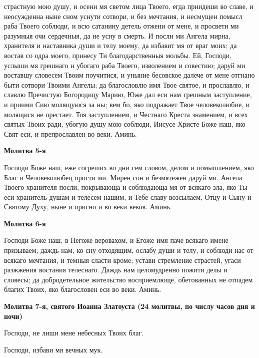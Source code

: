 страстную мою душу, и осени мя светом лица Твоего, егда приидеши во
славе, и неосужденна ныне сном уснути сотвори, и без мечтания, и
несмущен помысл раба Твоего соблюди, и всю сатанину детель отжени от
мене, и просвети ми разумныя очи сердечныя, да не усну в смерть. И
посли ми Ангела мирна, хранителя и наставника души и телу моему,
да избавит мя от враг моих; да востав со одра моего, принесу Ти
благодарственныя мольбы. Ей, Господи, услыши мя грешнаго и убогаго раба
Твоего, изволением и совестию; даруй ми воставшу словесем Твоим
поучитися, и уныние бесовское далече от мене отгнано быти сотвори
Твоими Ангелы; да благословлю имя Твое святое, и прославлю, и
славлю Пречистую Богородицу Марию, Юже дал еси нам грешным
заступление, и приими Сию молящуюся за ны; вем бо, яко подражает Твое
человеколюбие, и молящися не престает. Тоя заступлением, и Честнаго
Креста знамением, и всех святых Твоих ради, убогую душу мою соблюди,
Иисусе Христе Боже наш, яко Свят еси, и препрославлен во веки.
Аминь.



 

\bfseries Молитва 5-я\normalfont{}


   Господи Боже наш, еже согреших во дни сем словом, делом и
помышлением, яко Благ и Человеколюбец прости ми. Мирен сон и
безмятежен даруй ми. Ангела Твоего хранителя посли, покрывающа и
соблюдающа мя от всякаго зла, яко Ты еси хранитель душам и телесем
нашим, и Тебе славу возсылаем, Отцу и Сыну и Святому Духу, ныне и
присно и во веки веков. Аминь.



 

\bfseries Молитва 6-я\normalfont{}


   Господи Боже наш, в Негоже веровахом, и Егоже имя паче всякаго имене
призываем, даждь нам, ко сну отходящим, ослабу души и телу, и соблюди
нас от всякаго мечтания, и темныя сласти кроме; устави стремление
страстей, угаси разжжения востания телеснаго. Даждь нам целомудренно
пожити делы и словесы; да добродетельное жительство восприемлюще,
обетованных не отпадем благих Твоих, яко благословен еси во веки.
Аминь.




 

\bfseries Молитва 7-я, святого Иоанна Златоуста (24 молитвы, по числу часов дня
и ночи)\normalfont{}


   Господи, не лиши мене небесных Твоих благ.



   Господи, избави мя вечных мук.



